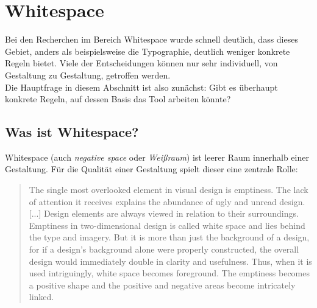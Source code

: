 
\chapter{Whitespace} %

\label{Whitespace} %



Bei den Recherchen im Bereich Whitespace wurde schnell deutlich, dass dieses Gebiet, anders als beispielsweise die Typographie, deutlich weniger konkrete Regeln bietet. Viele der Entscheidungen können nur sehr individuell, von Gestaltung zu Gestaltung, getroffen werden. \\
Die Hauptfrage in diesem Abschnitt ist also zunächst: Gibt es überhaupt konkrete Regeln, auf dessen Basis das Tool arbeiten könnte?


\section{Was ist Whitespace?}

Whitespace (auch \textit{negative space} oder \textit{Weißraum}) ist leerer Raum innerhalb einer Gestaltung. Für die Qualität einer Gestaltung spielt dieser eine zentrale Rolle:

\begin{quote}
The single most overlooked element in visual design is emptiness. The lack of attention it receives explains the abundance of ugly and unread design. [...]
Design elements are always viewed in relation to their surroundings. Emptiness in two-dimensional design is called white space and lies behind the type and imagery. But it is more than just the background of a design, for if a design's background alone were properly constructed, the overall design would immediately double in clarity and usefulness. Thus, when it is used intriguingly, white space becomes foreground. The emptiness becomes a positive shape and the positive and negative areas become intricately linked. \cite[S.19]{white2011elements}
\end{quote}

